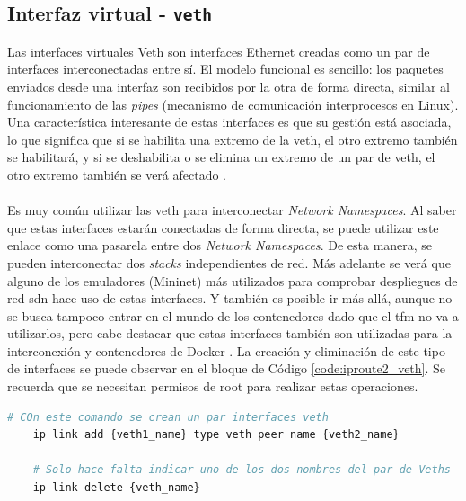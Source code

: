 \subsection{Interfaz virtual - \texttt{veth}}
\label{linuxVeths}
Las interfaces virtuales Veth son interfaces Ethernet creadas como un par de interfaces interconectadas entre sí. El modelo funcional es sencillo: los paquetes enviados desde una interfaz son recibidos por la otra de forma directa, similar al funcionamiento de las \textit{pipes} (mecanismo de comunicación interprocesos en Linux). Una característica interesante de estas interfaces es que su gestión está asociada, lo que significa que si se habilita una extremo de la \gls{veth}, el otro extremo también se habilitará, y si se deshabilita o se elimina un extremo de un par de \gls{veth}, el otro extremo también se verá afectado \cite{veth}.\\
\\
Es muy común utilizar las \gls{veth} para interconectar \textit{Network Namespaces}. Al saber que estas interfaces estarán conectadas de forma directa, se puede utilizar este enlace como una pasarela entre dos \textit{Network Namespaces}. De esta manera, se pueden interconectar dos \textit{stacks} independientes de red. Más adelante se verá que alguno de los emuladores (Mininet) más utilizados para comprobar despliegues de red \gls{sdn} hace uso de estas interfaces. Y también es posible ir más allá, aunque no se busca tampoco entrar en el mundo de los contenedores dado que el \gls{tfm} no va a utilizarlos, pero cabe destacar que estas interfaces también son utilizadas para la interconexión y contenedores de Docker \cite{veths1}. La creación y eliminación de este tipo de interfaces se puede observar en el bloque de Código \ref{code:iproute2_veth}. Se recuerda que se necesitan permisos de root para realizar estas operaciones.

\begin{lstlisting}[language= bash, style=Consola, caption={Uso de las interfaces Veths},label=code:iproute2_veth]
    # COn este comando se crean un par interfaces veth
    ip link add {veth1_name} type veth peer name {veth2_name}
    
    # Solo hace falta indicar uno de los dos nombres del par de Veths
    ip link delete {veth_name}
    
\end{lstlisting}
\vspace{0.5cm}



